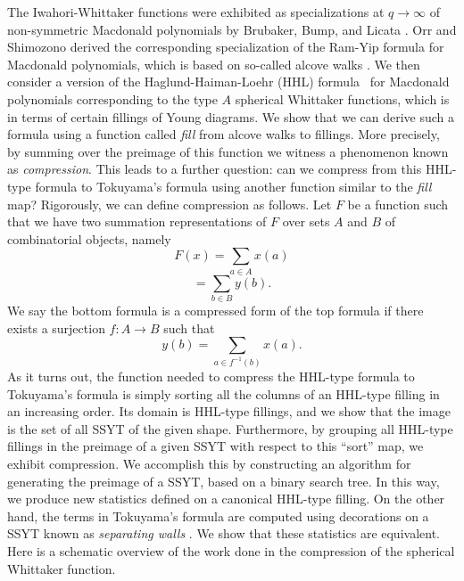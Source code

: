 \documentclass[11pt]{amsart}
\begin{document}
\newline\indent The Iwahori-Whittaker functions  were exhibited as specializations at $q\to \infty$ of non-symmetric Macdonald polynomials by Brubaker, Bump, and Licata \cite{BBL}.  Orr and Shimozono derived the corresponding specialization of the Ram-Yip formula for Macdonald polynomials, which is based on so-called alcove walks  \cite{OS}. We then consider a version  of the Haglund-Haiman-Loehr (HHL) formula~\cite{HHL0} for Macdonald polynomials corresponding to the type $A$ spherical Whittaker functions, which is in terms of certain fillings of Young diagrams. We show that we can derive such a formula using a function called \emph{fill} from alcove walks to fillings. More precisely, by summing over the preimage of this function we witness a phenomenon known as \emph{compression}. This leads to a further question: can we compress from this HHL-type formula to Tokuyama's formula using another function similar to the {\emph{fill} map?
\newline\indent Rigorously, we can define compression as follows. Let $F$ be a function such that we have two summation  representations of $F$ over sets $A$ and $B$ of combinatorial objects, namely
\begin{equation*}
F(x)=\sum_{a\in A}x(a)
\end{equation*}
\begin{equation*}
=\sum_{b\in B}y(b).
\end{equation*}
We say the bottom formula is a compressed form of the top formula if there exists a surjection $f:A\longrightarrow B$ such that 
\[
y(b)=\sum_{a \in f^{-1}(b)}x(a).
\]
\newline\indent As it turns out, the function needed to compress the HHL-type formula to Tokuyama's formula is simply sorting all the columns of an HHL-type filling in an increasing order. Its domain is HHL-type fillings, and we show that the image is the set of all SSYT of the given shape. Furthermore, by grouping all HHL-type fillings in the preimage of a given SSYT with respect to this ``sort'' map, we exhibit compression. We accomplish this by constructing an algorithm for generating the preimage of a SSYT, based on a binary search tree. In this way, we produce new statistics defined on a canonical HHL-type filling. On the other hand, the terms in Tokuyama's formula are computed using decorations on a SSYT known as \emph{separating walls} \cite{AP}. We show that these statistics are equivalent.    
\newline\indent Here is a schematic overview of the work done in the compression of the spherical Whittaker function.
}
\end{document}
